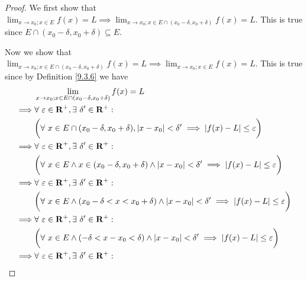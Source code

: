\begin{proof}
    We first show that \(\lim_{x \to x_0 ; x \in E} f(x) = L \implies \lim_{x \to x_0 ; x \in E \cap (x_0 - \delta, x_0 + \delta)} f(x) = L\).
    This is true since \(E \cap (x_0 - \delta, x_0 + \delta) \subseteq E\).

    Now we show that \(\lim_{x \to x_0 ; x \in E \cap (x_0 - \delta, x_0 + \delta)} f(x) = L \implies \lim_{x \to x_0 ; x \in E} f(x) = L\).
    This is true since by Definition \ref{9.3.6} we have
    \begin{align*}
                 & \lim_{x \to x_0 ; x \in E \cap (x_0 - \delta, x_0 + \delta)} f(x) = L                                                                          \\
        \implies & \forall\ \varepsilon \in \mathbf{R}^+, \exists\ \delta' \in \mathbf{R}^+ :                                                                     \\
                 & \bigg(\forall\ x \in E \cap (x_0 - \delta, x_0 + \delta), \abs*{x - x_0} < \delta' \implies \abs*{f(x) - L} \leq \varepsilon\bigg)             \\
        \implies & \forall\ \varepsilon \in \mathbf{R}^+, \exists\ \delta' \in \mathbf{R}^+ :                                                                     \\
                 & \bigg(\forall\ x \in E \land x \in (x_0 - \delta, x_0 + \delta) \land \abs*{x - x_0} < \delta' \implies \abs*{f(x) - L} \leq \varepsilon\bigg) \\
        \implies & \forall\ \varepsilon \in \mathbf{R}^+, \exists\ \delta' \in \mathbf{R}^+ :                                                                     \\
                 & \bigg(\forall\ x \in E \land (x_0 - \delta < x < x_0 + \delta) \land \abs*{x - x_0} < \delta' \implies \abs*{f(x) - L} \leq \varepsilon\bigg)  \\
        \implies & \forall\ \varepsilon \in \mathbf{R}^+, \exists\ \delta' \in \mathbf{R}^+ :                                                                     \\
                 & \bigg(\forall\ x \in E \land (-\delta < x - x_0 < \delta) \land \abs*{x - x_0} < \delta' \implies \abs*{f(x) - L} \leq \varepsilon\bigg)       \\
        \implies & \forall\ \varepsilon \in \mathbf{R}^+, \exists\ \delta' \in \mathbf{R}^+ :                                                                     \\

\end{align*}
\end{proof}
